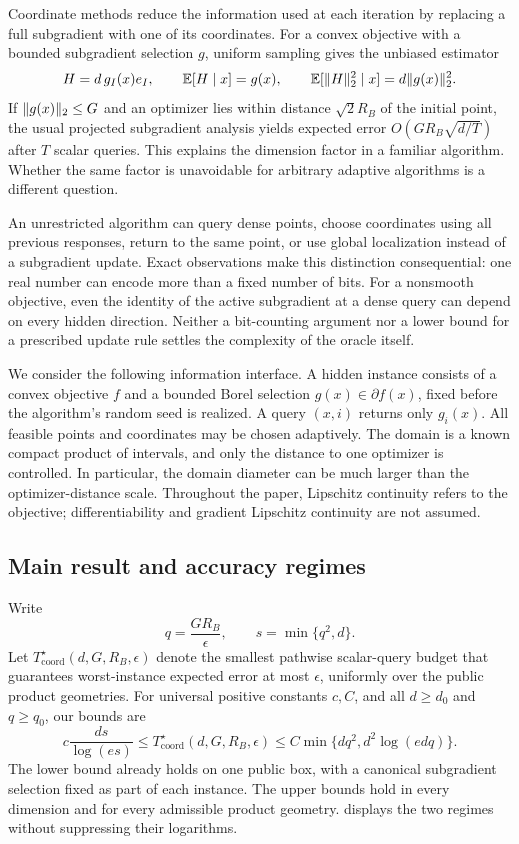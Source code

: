 \documentclass[11pt]{article}
\numberwithin{equation}{section}
\theoremstyle{definition}
\theoremstyle{remark}
\newcommand{\E}{\mathbb E}
\newcommand{\Tcoord}{T_{\mathrm{coord}}^\star}
\newcommand{\eps}{\epsilon}
\DeclarePairedDelimiter{\norm}{\lVert}{\rVert}
\begin{document}
Coordinate methods reduce the information used at each iteration by replacing a full subgradient with one of its coordinates. For a convex objective with a bounded subgradient selection $g$, uniform sampling gives the unbiased estimator
\[
H=d\,g_I(x)e_I,\qquad
\E[H\mid x]=g(x),\qquad
\E[\norm{H}_2^2\mid x]=d\norm{g(x)}_2^2.
\]
If $\norm{g(x)}_2\le G$ and an optimizer lies within distance $\sqrt2R_B$ of the initial point, the usual projected subgradient analysis yields expected error $O(GR_B\sqrt{d/T})$ after $T$ scalar queries. This explains the dimension factor in a familiar algorithm. Whether the same factor is unavoidable for arbitrary adaptive algorithms is a different question.

An unrestricted algorithm can query dense points, choose coordinates using all previous responses, return to the same point, or use global localization instead of a subgradient update. Exact observations make this distinction consequential: one real number can encode more than a fixed number of bits. For a nonsmooth objective, even the identity of the active subgradient at a dense query can depend on every hidden direction. Neither a bit-counting argument nor a lower bound for a prescribed update rule settles the complexity of the oracle itself.

We consider the following information interface. A hidden instance consists of a convex objective $f$ and a bounded Borel selection $g(x)\in\partial f(x)$, fixed before the algorithm's random seed is realized. A query $(x,i)$ returns only $g_i(x)$. All feasible points and coordinates may be chosen adaptively. The domain is a known compact product of intervals, and only the distance to one optimizer is controlled. In particular, the domain diameter can be much larger than the optimizer-distance scale. Throughout the paper, Lipschitz continuity refers to the objective; differentiability and gradient Lipschitz continuity are not assumed.

\subsection{Main result and accuracy regimes}

Write
\begin{equation}\label{eq:scales-intro}
q=\frac{GR_B}{\eps},\qquad s=\min\{q^2,d\}.
\end{equation}
Let $\Tcoord(d,G,R_B,\eps)$ denote the smallest pathwise scalar-query budget that guarantees worst-instance expected error at most $\eps$, uniformly over the public product geometries. For universal positive constants $c,C$, and all $d\ge d_0$ and $q\ge q_0$, our bounds are
\begin{equation}\label{eq:intro-frontier}
c\frac{ds}{\log(es)}
\le \Tcoord(d,G,R_B,\eps)
\le C\min\{dq^2,d^2\log(edq)\}.
\end{equation}
The lower bound already holds on one public box, with a canonical subgradient selection fixed as part of each instance. The upper bounds hold in every dimension and for every admissible product geometry.  displays the two regimes without suppressing their logarithms.
\end{document}
